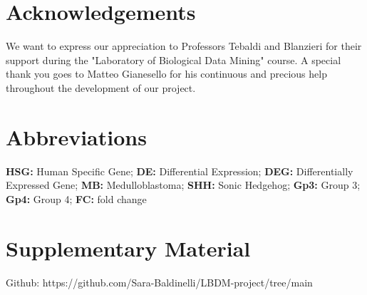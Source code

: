 \documentclass[10pt]{SelfArx} %
\begin{document}
\section*{Acknowledgements}\label{sec:Acknowledgements}
We want to express our appreciation to Professors Tebaldi and Blanzieri for their support during the "Laboratory of Biological Data Mining" course. 
A special thank you goes to Matteo Gianesello for his continuous and precious help throughout the development of our project. 

\section*{Abbreviations}\label{sec:Abbreviations}
\textbf{HSG:} Human Specific Gene; \textbf{DE:} Differential Expression; \textbf{DEG:} Differentially Expressed Gene; \textbf{MB:} Medulloblastoma; \textbf{SHH:} Sonic Hedgehog; \textbf{Gp3:} Group 3; \textbf{Gp4:} Group 4; \textbf{FC:} fold change

\section*{Supplementary Material}\label{sec:github}
Github: https://github.com/Sara-Baldinelli/LBDM-project/tree/main


\end{document}
